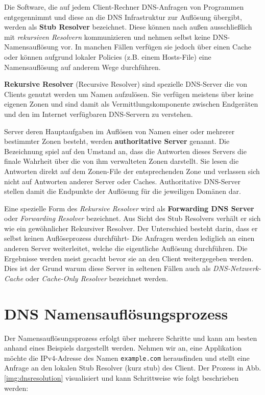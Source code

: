 Die Software, die auf jedem Client-Rechner DNS-Anfragen von Programmen entgegennimmt und diese an die DNS Infrastruktur zur Auflösung übergibt, werden als \textbf{Stub Resolver} bezeichnet. Diese können nach außen ausschließlich mit \textit{rekursiven Resolvern} kommunizieren und nehmen selbst keine DNS-Namensauflösung vor. In manchen Fällen verfügen sie jedoch über einen Cache oder können aufgrund lokaler Policies (z.B. einem Hosts-File) eine Namensauflösung auf anderem Wege durchführen.

\textbf{Rekursive Resolver} (Recursive Resolver) sind spezielle DNS-Server die von Clients genutzt werden um Namen aufzulösen. Sie verfügen meistens über keine eigenen Zonen und sind damit als Vermittlungskomponente zwischen Endgeräten und den im Internet verfügbaren DNS-Servern zu verstehen.

Server deren Hauptaufgaben im Auflösen von Namen einer oder mehrerer bestimmter Zonen besteht, werden \textbf{authoritative Server} genannt. Die Bezeichnung spiel auf den Umstand an, dass die Antworten dieses Servers die finale Wahrheit über die von ihm verwalteten Zonen darstellt. Sie lesen die Antworten direkt auf dem Zonen-File der entsprechenden Zone und verlassen sich nicht auf Antworten anderer Server oder Caches. Authoritative DNS-Server stellen damit die Endpunkte der Auflösung für die jeweiligen Domänen dar.

Eine spezielle Form des \textit{Rekursive Resolver} wird als \textbf{Forwarding DNS Server} oder \textit{Forwarding Resolver} bezeichnet. Aus Sicht des Stub Resolvers verhält er sich wie ein gewöhnlicher Rekursiver Resolver. Der Unterschied besteht darin, dass er selbst keinen Auflöseprozess durchführt- Die Anfragen werden lediglich an einen anderen Server weiterleitet, welche die eigentliche Auflösung durchführen. Die Ergebnisse werden meist gecacht bevor sie an den Client weitergegeben werden. Dies ist der Grund warum diese Server in seltenen Fällen auch als \textit{DNS-Netzwerk-Cache} oder \textit{Cache-Only Resolver} bezeichnet werden. 

\section{DNS Namensauflösungsprozess}
\label{sec:dnsresolution}

Der Namensauflösungsprozess erfolgt über mehrere Schritte und kann am besten anhand eines Beispiels dargestellt werden. Nehmen wir an, eine Applikation möchte die IPv4-Adresse des Namen \texttt{example.com} herausfinden und stellt eine Anfrage an den lokalen Stub Resolver (kurz stub) des Client. Der Prozess in Abb. \ref{img:dnsresolution} visualisiert und kann Schrittweise wie folgt beschrieben werden:

